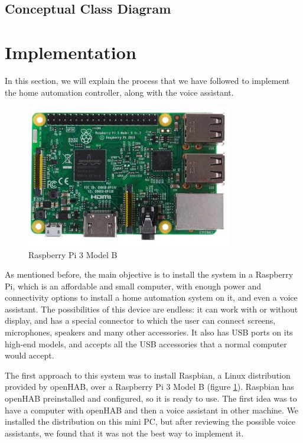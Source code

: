 \subsection{Conceptual Class Diagram}

\bigskip
\section{Implementation}
In this section, we will explain the process that we have followed to implement the home automation controller, along with the voice
assistant.

\begin{figure}
    \centering
    \includegraphics[width=0.8\textwidth]{images/Chapter_06/raspberry-pi-3b.jpg}
    \caption{Raspberry Pi 3 Model B}
    \label{fig:raspberry-pi-3b}
\end{figure}

As mentioned before, the main objective is to install the system in a Raspberry Pi, which is an affordable and small computer,
with enough power and connectivity options to install a home automation system on it, and even a voice assistant. The possibilities
of this device are endless: it can work with or without display, and has a special connector to which the user can connect screens,
microphones, speakers and many other accessories. It also has USB ports on its high-end models, and accepts all the USB
accessories that a normal computer would accept.\cite{raspberryPiDocs}

The first approach to this system was to install Raspbian, a Linux distribution provided by openHAB, over a Raspberry Pi 3 Model B
(figure \ref{fig:raspberry-pi-3b}). Raspbian has openHAB preinstalled and configured, so it is ready to use. The first idea was to
have a computer with openHAB and then a voice assistant in other machine. We installed the distribution on this mini PC, but after
reviewing the possible voice assistants, we found that it was not the best way to implement it.

